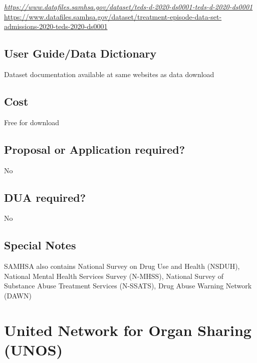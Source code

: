 \documentclass[
]{book}
\begin{document}
\emph{\url{https://www.datafiles.samhsa.gov/dataset/teds-d-2020-ds0001-teds-d-2020-ds0001}
}\url{https://www.datafiles.samhsa.gov/dataset/treatment-episode-data-set-admissions-2020-teds-2020-ds0001}

\hypertarget{user-guidedata-dictionary-89}{%
\section{User Guide/Data Dictionary}\label{user-guidedata-dictionary-89}}

Dataset documentation available at same websites as data download

\hypertarget{cost-89}{%
\section{Cost}\label{cost-89}}

Free for download

\hypertarget{proposal-or-application-required-89}{%
\section{Proposal or Application required?}\label{proposal-or-application-required-89}}

No

\hypertarget{dua-required-89}{%
\section{DUA required?}\label{dua-required-89}}

No

\hypertarget{special-notes-89}{%
\section{Special Notes}\label{special-notes-89}}

SAMHSA also contains National Survey on Drug Use and Health (NSDUH), National Mental Health Services Survey (N-MHSS), National Survey of Substance Abuse Treatment Services (N-SSATS), Drug Abuse Warning Network (DAWN)

\mainmatter

\hypertarget{united-network-for-organ-sharing-unos}{%
\chapter{United Network for Organ Sharing (UNOS)}\label{united-network-for-organ-sharing-unos}}
\end{document}
